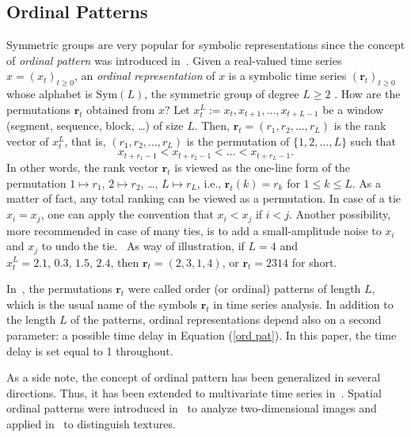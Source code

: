 \documentclass{article}
\begin{document}
\subsection{Ordinal Patterns}

\label{sec:OrdPat}

Symmetric groups are very popular for symbolic representations since the
concept of \textit{ordinal pattern} was introduced in~\cite{Bandt2002}.
Given a real-valued time series $x=(x_{t})_{t\geq 0}$, an \textit{ordinal
representation} of $x$ is a symbolic time series $(\mathbf{r}_{t})_{t\geq 0}$
whose alphabet is $\mathrm{Sym}(L)$, the symmetric group of degree $L\geq 2$%
. How are the permutations $\mathbf{r}_{t}$ obtained from $x$? Let $%
x_{t}^{L}:=x_{t},x_{t+1},\ldots,x_{t+L-1}$ be a window (segment, sequence,
block, \ldots) of size $L$. Then, $\mathbf{r}_{t}=(r_{1},r_{2},\ldots,r_{L})$ is
the rank vector of $x_{t}^{L}$, that is, $(r_{1},r_{2},\ldots,r_{L})$ is the
permutation of $\{1,2,\ldots,L\}$ such that%
\begin{equation}
x_{t+r_{1}-1}<x_{t+r_{2}-1}<\ldots<x_{t+r_{L}-1}.  \label{ord pat}
\end{equation}%
In other words, the rank vector $\mathbf{r}_{t}$ is viewed as the one-line
form of the permutation $1\mapsto r_{1}$, $2\mapsto r_{2}$, \ldots, $L\mapsto
r_{L}$, i.e., $\mathbf{r}_{t}(k)=r_{k}$ for $1\leq k\leq L$. As a matter of
fact, any total ranking can be viewed as a permutation. In case of a tie $%
x_{i}=x_{j}$, one can apply the convention that $x_{i}<x_{j}$ if $i<j$.
Another possibility, more recommended in case of many ties, is to add a
small-amplitude noise to $x_{i}$ and $x_{j}$ to undo the tie. \ As way of
illustration, if $L=4$ and $x_{t}^{L}=2.1,\,0.3,\,1.5,\,2.4$, then $\mathbf{r%
}_{t}=(2,3,1,4)$, or $\mathbf{r}_{t}=2314$ for short.

In~\cite{Bandt2002}, the permutations $\mathbf{r}_{t}$ were called order (or
ordinal) patterns of length $L$, which is the usual name of the
symbols $\mathbf{r}_{t}$ in time series analysis. In addition to the length $%
L$ of the patterns, ordinal representations depend also on a second
parameter: a possible time delay in Equation (\ref{ord pat}). In this paper,
the time delay is set equal to 1 throughout.

{As a side note, the concept of ordinal pattern has been generalized in several directions. Thus, it has been extended to multivariate time series in~\cite{Mohr2020,Amigo2013B}. Spatial ordinal patterns were introduced in~\cite{Ribeiro2012} to analyze two-dimensional images and applied in~\cite{Zunino2016,Bandt2023} to distinguish textures.}
\end{document}
